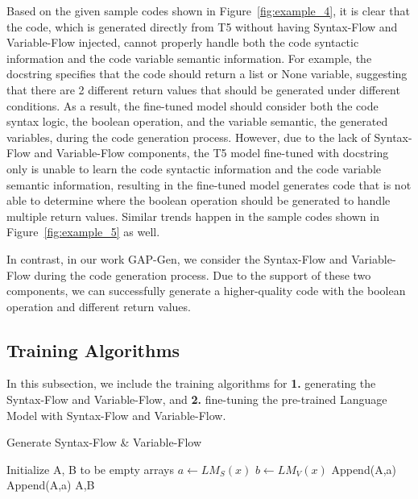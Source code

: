 \documentclass[11pt]{article}
\begin{document}
Based on the given sample codes shown in Figure~\ref{fig:example_4}, it is clear that the code, which is generated directly from T5 without having Syntax-Flow and Variable-Flow injected, cannot properly handle both the code syntactic information and the code variable semantic information. For example, the docstring specifies that the code should return a list or None variable, suggesting that there are 2 different return values that should be generated under different conditions. As a result, the fine-tuned model should consider both the code syntax logic, the boolean operation, and the variable semantic, the generated variables, during the code generation process. However, due to the lack of Syntax-Flow and Variable-Flow components, the T5 model fine-tuned with docstring only is unable to learn the code syntactic information and the code variable semantic information, resulting in the fine-tuned model generates code that is not able to determine where the boolean operation should be generated to handle multiple return values. Similar trends happen in the sample codes shown in Figure~\ref{fig:example_5} as well.


In contrast, in our work GAP-Gen, we consider the Syntax-Flow and Variable-Flow during the code generation process. Due to the support of these two components, we can successfully generate a higher-quality code with the boolean operation and different return values.
















\subsection{Training Algorithms}
In this subsection, we include the training algorithms for \textbf{1.} generating the Syntax-Flow and Variable-Flow, and \textbf{2.} fine-tuning the pre-trained Language Model with Syntax-Flow and Variable-Flow.
\label{sec:appendix}
\begin{algorithm}[ht!]
\caption{Generate Syntax-Flow \& Variable-Flow }\label{alg:wordy}
\begin{algorithmic}[1]
 \State Initialize A, B to be empty arrays
  \State $a \gets LM_S(x)$
  \State $b \gets LM_V(x)$
  \State Append(A,a)
  \State Append(A,a)
\EndFor
\State \Return A,B
\end{algorithmic}
\end{algorithm}
\end{document}
